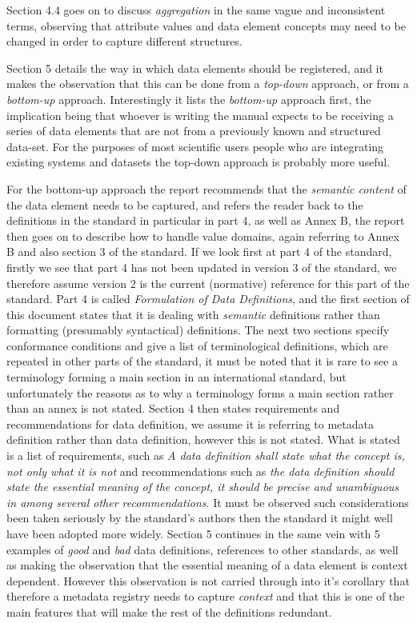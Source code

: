 \documentclass{article}
\begin{document}
Section 4.4 goes on to discuss \emph{aggregation} in the same vague and inconsistent terms, observing that attribute values and data element concepts may need to be changed in order to capture different structures.

Section 5 details the way in which data elements should be registered, and it makes the observation that this can be done from a \emph{top-down} approach, or from a \emph{bottom-up} approach. Interestingly it lists the \emph{bottom-up} approach first, the implication being that whoever is writing the manual expects to be receiving a series of data elements that are not from a previously known and structured data-set. For the purposes of most scientific users people who are integrating existing systems and datasets the top-down approach is probably more useful. 

For the bottom-up approach the report recommends that the \emph{semantic content} of the data element needs to be captured, and refers the reader back to the definitions in the standard in particular in part 4, as well as Annex B, the report then goes on to describe how to handle value domains, again referring to Annex B and also section 3 of the standard. If we look first at part 4 of the standard, firstly we see that part 4 has not been updated in version 3 of the standard, we therefore assume version 2 is the current (normative) reference for this part of the standard. Part 4 is called \emph{Formulation of Data Definitions}, and the first section of this document states that it is dealing with \emph{semantic} definitions rather than formatting (presumably syntactical) definitions. The next two sections specify conformance conditions and give a list of terminological definitions, which are repeated in other parts of the standard, it must be noted that it is rare to see a terminology forming a main section in an international standard, but unfortunately the reasons as to why a terminology forms a main section rather than an annex is not stated. Section 4 then states requirements and recommendations for data definition, we assume it is referring to metadata definition rather than data definition, however this is not stated. What is stated is a list of requirements, such as \emph{A data definition shall state what the concept is, not only what it is not} and recommendations such as \emph{the data definition should state the essential meaning of the concept, it should be precise and unambiguous in among several other recommendations}. It must be observed such considerations been taken seriously by the standard's authors then the standard it might well have been adopted more widely. Section 5 continues in the same vein with 5 examples of \emph{good} and \emph{bad} data definitions, references to other standards, as well as making the observation that the essential meaning of a data element is context dependent. However this observation is not carried through into it's corollary that therefore a metadata registry needs to capture \emph{context} and that this is one of the main features that will make the rest of the definitions redundant. 
\end{document}
